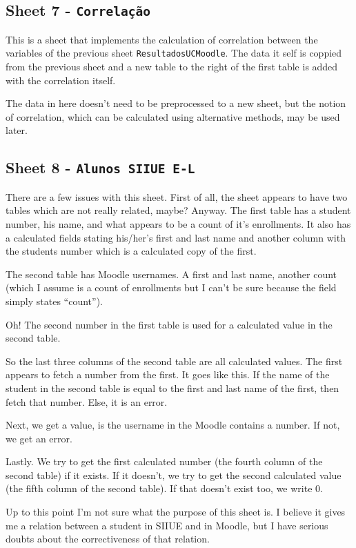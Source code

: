 \subsection{Sheet 7 - \texttt{Correlação}}

This is a sheet that implements the calculation of correlation between the
variables of the previous sheet \texttt{ResultadosUCMoodle}. The data it self
is coppied from the previous sheet and a new table to the right of the first
table is added with the correlation itself.

The data in here doesn't need to be preprocessed to a new sheet, but the notion
of correlation, which can be calculated using alternative methods, may be used
later.

\subsection{Sheet 8 - \texttt{Alunos SIIUE E-L}}

There are a few issues with this sheet. First of all, the sheet appears to have
two tables which are not really related, maybe? Anyway. The first table has a
student number, his name, and what appears to be a count of it's enrollments.
It also has a calculated fields stating his/her's first and last name and
another column with the students number which is a calculated copy of the
first.

The second table has Moodle usernames. A first and last name, another count
(which I assume is a count of enrollments but I can't be sure because the field
simply states ``count'').

Oh! The second number in the first table is used for a calculated value in the
second table.

So the last three columns of the second table are all calculated values. The
first appears to fetch a number from the first. It goes like this. If the name
of the student in the second table is equal to the first and last name of the
first, then fetch that number. Else, it is an error.

Next, we get a value, is the username in the Moodle contains a number. If not,
we get an error.

Lastly. We try to get the first calculated number (the fourth column of the
second table) if it exists. If it doesn't, we try to get the second calculated
value (the fifth column of the second table). If that doesn't exist too, we
write 0.

Up to this point I'm not sure what the purpose of this sheet is. I believe it
gives me a relation between a student in SIIUE and in Moodle, but I have
serious doubts about the correctiveness of that relation.

